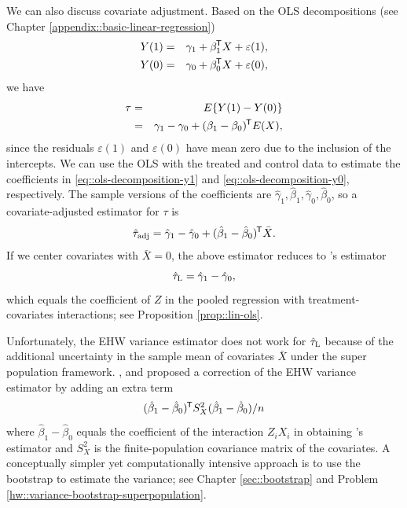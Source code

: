 We can also discuss covariate adjustment. Based on the OLS decompositions (see Chapter \ref{appendix::basic-linear-regression})
\begin{eqnarray}
Y(1) &=& \gamma_1 + \beta_1\tran X + \varepsilon(1),\label{eq::ols-decomposition-y1}\\
Y(0) &=& \gamma_0 + \beta_0\tran X + \varepsilon(0),\label{eq::ols-decomposition-y0}
\end{eqnarray}
we have
\begin{eqnarray*}
\tau  &=& E\{  Y(1)  - Y(0)\} \\
&=& \gamma_1  -  \gamma_0 + (\beta_1 - \beta_0)^{\mkern-1.5mu\mathsf{T}} E(X),
\end{eqnarray*}
since the residuals $  \varepsilon(1)$ and $\varepsilon(0)$ have mean zero due to the inclusion of the intercepts. 
We can use the OLS with the treated and control data to estimate the coefficients in \eqref{eq::ols-decomposition-y1} and \eqref{eq::ols-decomposition-y0}, respectively. The sample versions of the coefficients are $\hat{\gamma}_1, \hat{\beta}_1, \hat{\gamma}_0, \hat{\beta}_0$, so a covariate-adjusted estimator for  $\tau $ is
$$
\hat{\tau}_\text{adj} =  \hat \gamma_1  - \hat  \gamma_0 + (\hat \beta_1 - \hat \beta_0)^{\mkern-1.5mu\mathsf{T}} \bar{X}.
$$
If we center covariates with $ \bar{X} = 0$, the above estimator reduces to \citet{lin2013}'s estimator
$$
\hat{\tau}_\textsc{L} = \hat \gamma_1  - \hat  \gamma_0,
$$
which equals the coefficient of $Z$ in the pooled regression with treatment-covariates interactions; see Proposition \ref{prop::lin-ols}. 



Unfortunately, the EHW variance estimator does not work for $\hat{\tau}_\textsc{L}$ because of the additional uncertainty in the sample mean of covariates $\bar{X} $ under the super population framework. \citet{berk2013covariance}, \citet{negi2020revisiting} and \citet{zhao2020caFRT} proposed a correction of the EHW variance estimator by adding an extra term
\begin{equation}\label{eq::lin-ehw-correction}
(\hat \beta_1 - \hat \beta_0)\tran S_X^2  (\hat \beta_1 - \hat \beta_0)  / n
\end{equation}
where $\hat \beta_1 - \hat \beta_0$ equals the coefficient of the interaction $Z_iX_i$ in obtaining \citet{lin2013}'s estimator and $S_X^2$ is the finite-population covariance matrix of the covariates. 
A conceptually simpler yet computationally intensive approach is to use the bootstrap to estimate the variance; see Chapter \ref{sec::bootstrap} and Problem \ref{hw::variance-bootstrap-superpopulation}. 



